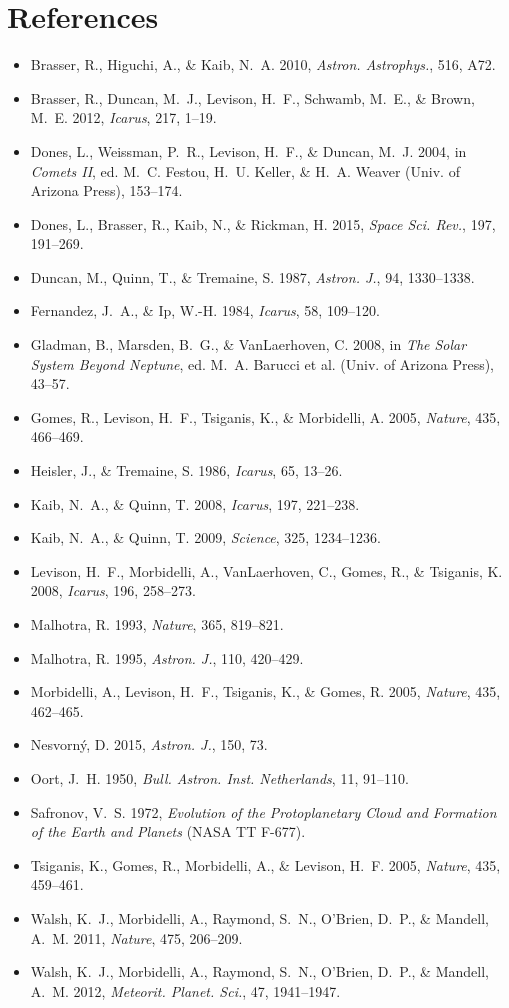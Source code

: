 \documentclass[11pt,a4paper]{article}
\begin{document}
\section*{References}
\begin{itemize}
    \item Brasser, R., Higuchi, A., \& Kaib, N.~A. 2010, \textit{Astron. Astrophys.}, 516, A72.
    \item Brasser, R., Duncan, M.~J., Levison, H.~F., Schwamb, M.~E., \& Brown, M.~E. 2012, \textit{Icarus}, 217, 1--19.
    \item Dones, L., Weissman, P.~R., Levison, H.~F., \& Duncan, M.~J. 2004, in \textit{Comets II}, ed. M.~C. Festou, H.~U. Keller, \& H.~A. Weaver (Univ. of Arizona Press), 153--174.
    \item Dones, L., Brasser, R., Kaib, N., \& Rickman, H. 2015, \textit{Space Sci. Rev.}, 197, 191--269.
    \item Duncan, M., Quinn, T., \& Tremaine, S. 1987, \textit{Astron. J.}, 94, 1330--1338.
    \item Fernandez, J.~A., \& Ip, W.-H. 1984, \textit{Icarus}, 58, 109--120.
    \item Gladman, B., Marsden, B.~G., \& VanLaerhoven, C. 2008, in \textit{The Solar System Beyond Neptune}, ed. M.~A. Barucci et al. (Univ. of Arizona Press), 43--57.
    \item Gomes, R., Levison, H.~F., Tsiganis, K., \& Morbidelli, A. 2005, \textit{Nature}, 435, 466--469.
    \item Heisler, J., \& Tremaine, S. 1986, \textit{Icarus}, 65, 13--26.
    \item Kaib, N.~A., \& Quinn, T. 2008, \textit{Icarus}, 197, 221--238.
    \item Kaib, N.~A., \& Quinn, T. 2009, \textit{Science}, 325, 1234--1236.
    \item Levison, H.~F., Morbidelli, A., VanLaerhoven, C., Gomes, R., \& Tsiganis, K. 2008, \textit{Icarus}, 196, 258--273.
    \item Malhotra, R. 1993, \textit{Nature}, 365, 819--821.
    \item Malhotra, R. 1995, \textit{Astron. J.}, 110, 420--429.
    \item Morbidelli, A., Levison, H.~F., Tsiganis, K., \& Gomes, R. 2005, \textit{Nature}, 435, 462--465.
    \item Nesvorn{\'y}, D. 2015, \textit{Astron. J.}, 150, 73.
    \item Oort, J.~H. 1950, \textit{Bull. Astron. Inst. Netherlands}, 11, 91--110.
    \item Safronov, V.~S. 1972, \textit{Evolution of the Protoplanetary Cloud and Formation of the Earth and Planets} (NASA TT F-677).
    \item Tsiganis, K., Gomes, R., Morbidelli, A., \& Levison, H.~F. 2005, \textit{Nature}, 435, 459--461.
    \item Walsh, K.~J., Morbidelli, A., Raymond, S.~N., O'Brien, D.~P., \& Mandell, A.~M. 2011, \textit{Nature}, 475, 206--209.
    \item Walsh, K.~J., Morbidelli, A., Raymond, S.~N., O'Brien, D.~P., \& Mandell, A.~M. 2012, \textit{Meteorit. Planet. Sci.}, 47, 1941--1947.
\end{itemize}
\end{document}
